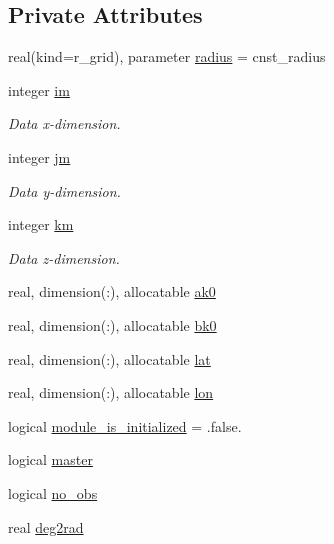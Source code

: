 \subsection*{Private Attributes}
\begin{DoxyCompactItemize}
\item 
real(kind=r\-\_\-grid), parameter \hyperlink{classfv__nwp__nudge__mod_a558bf04275fcbb1d8f4debc8cca46876}{radius} = cnst\-\_\-radius
\item 
integer \hyperlink{classfv__nwp__nudge__mod_af4efcd0125a8753cccf9edea473212fe}{im}
\begin{DoxyCompactList}\small\item\em Data x-\/dimension. \end{DoxyCompactList}\item 
integer \hyperlink{classfv__nwp__nudge__mod_a14bdbe362e391feaf152589a422108c9}{jm}
\begin{DoxyCompactList}\small\item\em Data y-\/dimension. \end{DoxyCompactList}\item 
integer \hyperlink{classfv__nwp__nudge__mod_aa78148a3d1f41821741078945e55fd91}{km}
\begin{DoxyCompactList}\small\item\em Data z-\/dimension. \end{DoxyCompactList}\item 
real, dimension(\-:), allocatable \hyperlink{classfv__nwp__nudge__mod_a53a22f63c5e330aa0ee01b47aa9778a1}{ak0}
\item 
real, dimension(\-:), allocatable \hyperlink{classfv__nwp__nudge__mod_a0af47ffec9b92d67039b57e73d9a22ed}{bk0}
\item 
real, dimension(\-:), allocatable \hyperlink{classfv__nwp__nudge__mod_a0ff5513f7944f3fabb87a8383880a470}{lat}
\item 
real, dimension(\-:), allocatable \hyperlink{classfv__nwp__nudge__mod_ab49ca48851ebaafd62ff97f3e6d2af1f}{lon}
\item 
logical \hyperlink{classfv__nwp__nudge__mod_afe93a474895ccd632d9dfb88785e62f5}{module\-\_\-is\-\_\-initialized} = .false.
\item 
logical \hyperlink{classfv__nwp__nudge__mod_a6d58b3c58863d536ee597b0f8efb6dbd}{master}
\item 
logical \hyperlink{classfv__nwp__nudge__mod_a5a12cd412f969c30a2e68bb95a4dae80}{no\-\_\-obs}
\item 
real \hyperlink{classfv__nwp__nudge__mod_abf75628ab28896add786d9e88b4b26ab}{deg2rad}

\end{DoxyCompactItemize}
